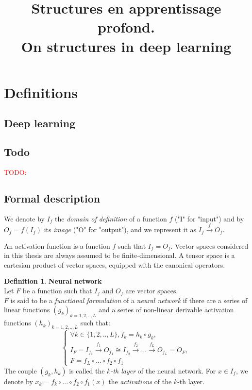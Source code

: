 \documentclass{article}
\title{Structures en apprentissage profond.\\ On structures in deep learning}
\theoremstyle{definition}
\newtheorem{definition}{Definition}[section]
\newcommand{\todo}[1]{\textcolor{red}{TODO: #1}}
\begin{document}
\section{Definitions}

\subsection{Deep learning}

\subsection{Todo}
\todo{}

\subsection{Formal description}

We denote by $I_f$ the \textit{domain of definition} of a function $f$ ("I" for "input") and by $O_f = f(I_f)$ its \textit{image} ("O" for "output"), and we represent it as $I_f \xrightarrow{f} O_f$.

An activation function is a function $f$ such that $I_f = O_f$.
Vector spaces considered in this thesis are always assumed to be finite-dimensional.
A tensor space is a cartesian product of vector spaces, equipped with the canonical operators.

\begin{definition}\textbf{Neural network}\\
{Let $F$ be a function such that $I_f$ and $O_f$ are vector spaces.\\
$F$ is said to be a \emph{functional formulation} of a \emph{neural network} if there are a series of linear functions $(g_k)_{k=1,2,..,L}$ and a series of non-linear derivable activation functions $(h_k)_{k=1,2,..,L}$ such that:
$$
\left\{
  \begin{array}{l}
    \forall k \in \{1,2,..,L\}, f_k = h_k \circ g_k, \\
    I_F = I_{f_1} \xrightarrow{f_1} O_{f_1} \cong I_{f_2} \xrightarrow{f_2} \dots \xrightarrow{f_L} O_{f_L} = O_F, \\
    F = f_{L} \circ ... \circ f_{2} \circ f_1
  \end{array}
\right.
$$
The couple $(g_k, h_k)$ is called the \emph{$k$-th layer} of the neural network.
For $x \in I_f$, we denote by $x_k = f_k \circ ... \circ f_{2} \circ f_1 (x)$ the \emph{activations} of the $k$-th layer.
}
\end{definition}
\end{document}
